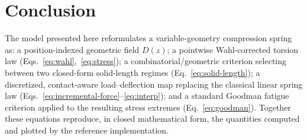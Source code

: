 \documentclass[11pt]{article}
\begin{document}
\section{Conclusion}

The model presented here reformulates a variable-geometry compression
spring as: a position-indexed geometric field $D(z)$; a pointwise
Wahl-corrected torsion law (Eqs.~\eqref{eq:wahl},~\eqref{eq:stress}); a
combinatorial/geometric criterion selecting between two closed-form
solid-length regimes (Eq.~\eqref{eq:solid-length}); a discretized,
contact-aware load--deflection map replacing the classical linear spring
law (Eqs.~\eqref{eq:incremental-force}--\eqref{eq:interp}); and a
standard Goodman fatigue criterion applied to the resulting stress
extremes (Eq.~\eqref{eq:goodman}). Together these equations reproduce,
in closed mathematical form, the quantities computed and plotted by the
reference implementation.
\end{document}
